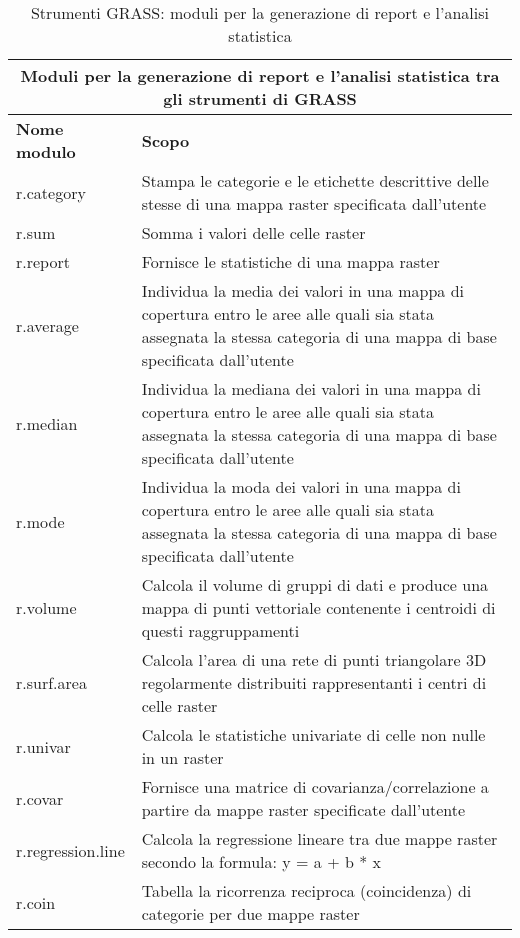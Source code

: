 \begin{table}[ht]
\centering
\caption{Strumenti GRASS: moduli per la generazione di report e l'analisi statistica}\medskip
 \begin{tabular}{|p{4cm}|p{12cm}|}
  \hline \multicolumn{2}{|c|}{\textbf{Moduli per la generazione di report e l'analisi statistica tra gli strumenti di GRASS}} \\
  \hline \textbf{Nome modulo} & \textbf{Scopo} \\
  \hline r.category & Stampa le categorie e le etichette descrittive delle stesse di una mappa raster specificata dall'utente \\
  \hline r.sum & Somma i valori delle celle raster \\
  \hline r.report & Fornisce le statistiche di una mappa raster \\
  \hline r.average & Individua la media dei valori in una mappa di copertura entro le aree alle quali sia stata assegnata la stessa categoria di una mappa di base specificata dall'utente \\
  \hline r.median & Individua la mediana dei valori in una mappa di copertura entro le aree alle quali sia stata assegnata la stessa categoria di una mappa di base specificata dall'utente \\
  \hline r.mode & Individua la moda dei valori in una mappa di copertura entro le aree alle quali sia stata assegnata la stessa categoria di una mappa di base specificata dall'utente  \\
  \hline r.volume & Calcola il volume di gruppi di dati e produce una mappa di punti vettoriale contenente i centroidi di questi raggruppamenti \\
  \hline r.surf.area & Calcola l'area di una rete di punti triangolare 3D regolarmente distribuiti rappresentanti i centri di celle raster \\
  \hline r.univar & Calcola le statistiche univariate di celle non nulle in un raster \\
  \hline r.covar & Fornisce una matrice di covarianza/correlazione a partire da mappe raster specificate dall'utente \\
  \hline r.regression.line & Calcola la regressione lineare tra due mappe raster secondo la formula: y = a + b * x \\
  \hline r.coin & Tabella la ricorrenza reciproca (coincidenza) di categorie per due mappe raster \\
\hline
\end{tabular}
\end{table}

